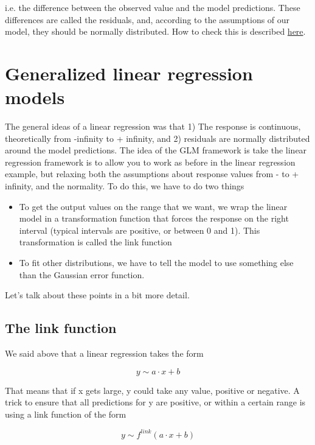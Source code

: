 \documentclass[a4paper,twoside]{tufte-book} %
\begin{document}
i.e. the difference between the observed value and the model predictions. These differences are called the residuals, and, according to the assumptions of our model, they should be normally distributed. How to check this is described \href{http://www.statmethods.net/stats/rdiagnostics.html}{here}.

\section{Generalized linear regression models}

The general ideas of a linear regression was that 1) The response is continuous, theoretically from -infinity to + infinity, and 2) residuals are normally distributed around the model predictions. The idea of the GLM framework is take the linear regression framework is to allow you to work as before in the linear regression example, but relaxing both the assumptions about response values from - to + infinity, and the normality. To do this, we have to do two things

\begin{itemize}
  \item To get the output values on the range that we want, we wrap the linear model in a transformation function that forces the response on the right interval (typical intervals are positive, or between 0 and 1). This transformation is called the link function
	\item To fit other distributions, we have to tell the model to use something else than the Gaussian error function. 
\end{itemize}    
   
Let's talk about these points in a bit more detail.

\subsection{The link function}

We said above that a linear regression takes the form 

\begin{equation}
y \sim a \cdot x + b 
\end{equation}

That means that if x gets large, y could take any value, positive or negative. A trick to ensure that all predictions for y are positive, or within a certain range is using a link function of the form 

\begin{equation}
y \sim f^{link}(a \cdot x + b )
\end{equation}
\end{document}
